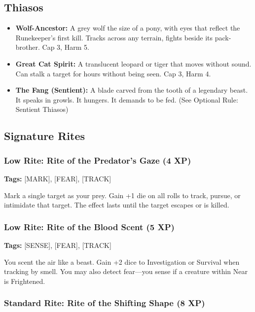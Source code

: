 \subsection{Thiasos}

\begin{itemize}
\item \textbf{Wolf-Ancestor:} A grey wolf the size of a pony, with eyes that reflect the Runekeeper's first kill. Tracks across any terrain, fights beside its pack-brother. Cap 3, Harm 5.
\item \textbf{Great Cat Spirit:} A translucent leopard or tiger that moves without sound. Can stalk a target for hours without being seen. Cap 3, Harm 4.
\item \textbf{The Fang (Sentient):} A blade carved from the tooth of a legendary beast. It speaks in growls. It hungers. It demands to be fed. (See Optional Rule: Sentient Thiasos)
\end{itemize}

\subsection{Signature Rites}

\subsubsection{Low Rite: Rite of the Predator's Gaze (4 XP)}

\textbf{Tags:} [MARK], [FEAR], [TRACK]

Mark a single target as your prey. Gain +1 die on all rolls to track, pursue, or intimidate that target. The effect lasts until the target escapes or is killed.

\subsubsection{Low Rite: Rite of the Blood Scent (5 XP)}

\textbf{Tags:} [SENSE], [FEAR], [TRACK]

You scent the air like a beast. Gain +2 dice to Investigation or Survival when tracking by smell. You may also detect fear—you sense if a creature within Near is Frightened.

\subsubsection{Standard Rite: Rite of the Shifting Shape (8 XP)}

